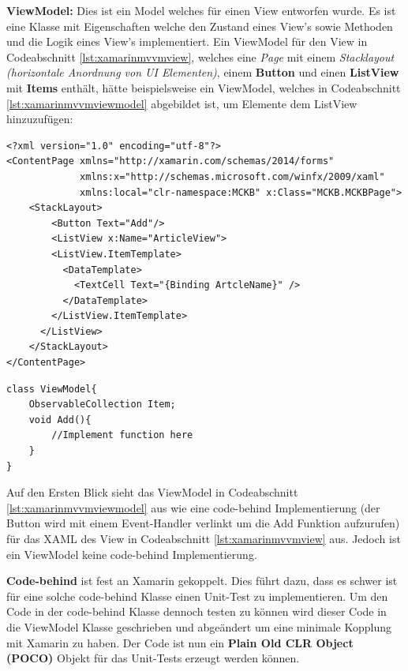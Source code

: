 	\textbf{ViewModel:} Dies ist ein Model welches für einen View entworfen wurde. Es ist eine Klasse mit Eigenschaften welche den Zustand eines View's sowie Methoden und die Logik eines View's implementiert.
	\newpage
	Ein ViewModel für den View in Codeabschnitt \ref{lst:xamarinmvvmview}, welches eine \textit{Page} mit einem \textit{Stacklayout (horizontale Anordnung von UI Elementen)}, einem \textbf{Button} und einen \textbf{ListView} mit \textbf{Items} enthält, hätte beispielsweise ein ViewModel, welches in Codeabschnitt \ref{lst:xamarinmvvmviewmodel} abgebildet ist, um Elemente dem ListView hinzuzufügen:\\

	\begin{lstlisting}[caption={Beispiel View},label={lst:xamarinmvvmview},captionpos=b,style=JAVA-Own]
<?xml version="1.0" encoding="utf-8"?>
<ContentPage xmlns="http://xamarin.com/schemas/2014/forms"
             xmlns:x="http://schemas.microsoft.com/winfx/2009/xaml"
             xmlns:local="clr-namespace:MCKB" x:Class="MCKB.MCKBPage">
    <StackLayout>
        <Button Text="Add"/>
        <ListView x:Name="ArticleView">
        <ListView.ItemTemplate>
          <DataTemplate>
            <TextCell Text="{Binding ArtcleName}" />
          </DataTemplate>
        </ListView.ItemTemplate>
      </ListView>
    </StackLayout>
</ContentPage>
	\end{lstlisting}

	\begin{lstlisting}[caption={Beispiel ViewModel für Codeabschnitt \ref{lst:xamarinmvvmview} (View)},label={lst:xamarinmvvmviewmodel},captionpos=b,style=JAVA-Own]
class ViewModel{
	ObservableCollection Item;
	void Add(){
		//Implement function here
	}
}
	\end{lstlisting}

	Auf den Ersten Blick sieht das ViewModel in Codeabschnitt \ref{lst:xamarinmvvmviewmodel} aus wie eine code-behind Implementierung (der Button wird mit einem Event-Handler verlinkt um die Add Funktion aufzurufen) für das XAML des View in Codeabschnitt \ref{lst:xamarinmvvmview} aus. Jedoch ist ein ViewModel keine code-behind Implementierung.

	\textbf{Code-behind} ist fest an Xamarin gekoppelt. Dies führt dazu, dass es schwer ist für eine solche code-behind Klasse einen Unit-Test zu implementieren. Um den Code in der code-behind Klasse dennoch testen zu können wird dieser Code in die ViewModel Klasse geschrieben und abgeändert um eine minimale Kopplung mit Xamarin zu haben. Der Code ist nun ein \textbf{Plain Old CLR Object (POCO)} Objekt für das Unit-Tests erzeugt werden können.

